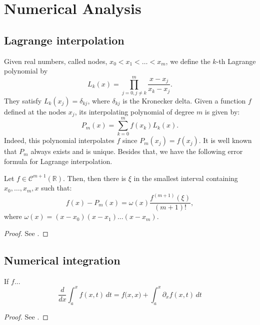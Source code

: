 \chapter{Numerical Analysis}
\label{anexo-na}

\section{Lagrange interpolation}
\label{anexo-interp}
Given real numbers, called nodes, $x_0< x_1 < \ldots< x_m$, we define the $k$-th Lagrange polynomial by
\begin{equation*}
	L_k(x) = \prod_{j=0, j \neq k}^{m}\frac{x-x_j}{x_k-x_j}.
\end{equation*}
They satisfy $L_k(x_j) = \delta_{kj}$, where  $\delta_{kj}$ is the Kronecker delta.
Given a function $f$ defined at the nodes $x_j$, its interpolating polynomial of 
degree $m$ is given by:
\begin{equation*}
	P_m(x) = \sum_{k=0}^{m} f(x_k)L_k(x).
\end{equation*}
Indeed, this polynomial interpolates $f$ since $P_m(x_j) = f(x_j)$.
It is well known that $P_m$ always exists and is unique. Besides that, we have the following error formula
for Lagrange interpolation.
\begin{thrm}
	\label{anexo-interp-error1}
	Let $f \in \mathcal{C}^{m+1}(\mathbb{R})$.
	Then, then there is $\xi$ in the smallest interval containing $x_0, \ldots, x_m, x$ such that:
	\begin{equation}
		f(x)-P_m(x) = \omega(x)\frac{f^{(m+1)}(\xi)}{(m+1)!},
	\end{equation}
	where $\omega(x) = (x-x_0)(x-x_1) \ldots (x-x_m)$.
\end{thrm}
\begin{proof}
	See \citet[Theorem~2.1.4.1. on \pno~49]{stoer:2002}.
\end{proof}

\section{Numerical integration}
\label{anexo-numint}
\begin{thrm}
	\label{anexo-numint-lr}
   If $f$...
	\begin{equation*}
	\frac{d}{dx}\int_{a}^{x}f(x,t) \,dt =
   f\big(x, x\big)+
	\int_{a}^{x}\partial_x f(x,t) \,dt
	\end{equation*}
\end{thrm}
\begin{proof}
	See \citet[\pno~143]{courant:1999}.
\end{proof}


